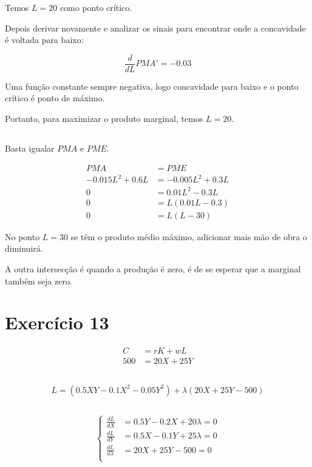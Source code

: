 \documentclass{article}
\begin{document}
Temos \(L = 20 \) como ponto crítico.

Depois derivar novamente e analizar os sinais para encontrar onde a concavidade
é voltada para baixo:

\[
	\frac{d}{dL}PMA' = - 0.03
\]

Uma função constante sempre negativa, logo concavidade para baixo e o ponto
crítico é ponto de máximo.

Portanto, para maximizar o produto marginal, temos \(L = 20\).

\subsection{}

Basta igualar \(PMA\) e \(PME\).

\[
	\begin{aligned}
		PMA              & = PME              \\
		-0.015L^2 + 0.6L & = -0.005L^2 + 0.3L \\
		0                & = 0.01L^2 - 0.3L   \\
		0                & = L(0.01L - 0.3)   \\
		0                & = L(L - 30)
	\end{aligned}
\]

No ponto \(L=30\) se têm o produto médio máximo, adicionar mais mão de obra o
diminuirá.

A outra intersecção é quando a produção é zero, é de se esperar que a marginal
também seja zero.

\section{Exercício 13}

\[
	\begin{aligned}
		C   & = rK + wL   \\
		500 & = 20X + 25Y
	\end{aligned}
\]

\subsection{}
\[
	L = (0.5XY - 0.1X^2 - 0.05Y^2) + \lambda(20X + 25Y - 500)
\]

\subsection{}
\[
	\left\{
	\begin{aligned}
		\frac{dL}{dX}       & = 0.5Y - 0.2X + 20\lambda = 0 \\
		\frac{dL}{dY}       & = 0.5X - 0.1Y + 25\lambda = 0 \\
		\frac{dL}{d\lambda} & = 20X + 25Y - 500 = 0         \\
	\end{aligned}
	\right.
\]
\end{document}
